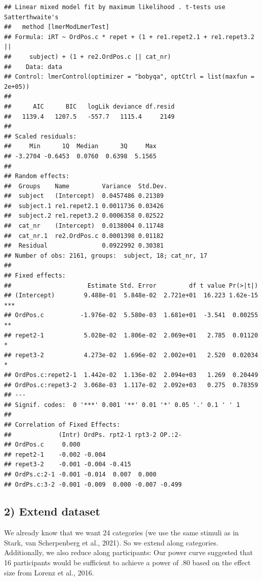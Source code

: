 \documentclass[
]{article}
\begin{document}
\begin{verbatim}
## Linear mixed model fit by maximum likelihood . t-tests use Satterthwaite's
##   method [lmerModLmerTest]
## Formula: iRT ~ OrdPos.c * repet + (1 + re1.repet2.1 + re1.repet3.2 ||  
##     subject) + (1 + re2.OrdPos.c || cat_nr)
##    Data: data
## Control: lmerControl(optimizer = "bobyqa", optCtrl = list(maxfun = 2e+05))
## 
##      AIC      BIC   logLik deviance df.resid 
##   1139.4   1207.5   -557.7   1115.4     2149 
## 
## Scaled residuals: 
##     Min      1Q  Median      3Q     Max 
## -3.2704 -0.6453  0.0760  0.6398  5.1565 
## 
## Random effects:
##  Groups    Name         Variance  Std.Dev.
##  subject   (Intercept)  0.0457486 0.21389 
##  subject.1 re1.repet2.1 0.0011736 0.03426 
##  subject.2 re1.repet3.2 0.0006358 0.02522 
##  cat_nr    (Intercept)  0.0138004 0.11748 
##  cat_nr.1  re2.OrdPos.c 0.0001398 0.01182 
##  Residual               0.0922992 0.30381 
## Number of obs: 2161, groups:  subject, 18; cat_nr, 17
## 
## Fixed effects:
##                     Estimate Std. Error         df t value Pr(>|t|)    
## (Intercept)        9.488e-01  5.848e-02  2.721e+01  16.223 1.62e-15 ***
## OrdPos.c          -1.976e-02  5.580e-03  1.681e+01  -3.541  0.00255 ** 
## repet2-1           5.028e-02  1.806e-02  2.069e+01   2.785  0.01120 *  
## repet3-2           4.273e-02  1.696e-02  2.002e+01   2.520  0.02034 *  
## OrdPos.c:repet2-1  1.442e-02  1.136e-02  2.094e+03   1.269  0.20449    
## OrdPos.c:repet3-2  3.068e-03  1.117e-02  2.092e+03   0.275  0.78359    
## ---
## Signif. codes:  0 '***' 0.001 '**' 0.01 '*' 0.05 '.' 0.1 ' ' 1
## 
## Correlation of Fixed Effects:
##             (Intr) OrdPs. rpt2-1 rpt3-2 OP.:2-
## OrdPos.c     0.000                            
## repet2-1    -0.002 -0.004                     
## repet3-2    -0.001 -0.004 -0.415              
## OrdPs.c:2-1 -0.001 -0.014  0.007  0.000       
## OrdPs.c:3-2 -0.001 -0.009  0.000 -0.007 -0.499
\end{verbatim}

\hypertarget{extend-dataset-1}{%
\subsection{2) Extend dataset}\label{extend-dataset-1}}

We already know that we want 24 categories (we use the same stimuli as
in Stark, van Scherpenberg et al., 2021). So we extend along
categories.\\
Additionally, we also reduce along participants: Our power curve
suggested that 16 participants would be sufficient to achieve a power of
.80 based on the effect size from Lorenz et al., 2016.
\end{document}
